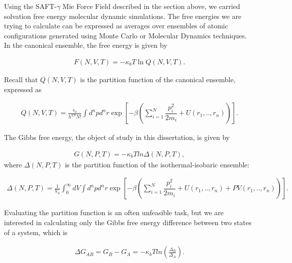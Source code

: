 	Using the SAFT-$\gamma$ Mie Force Field described in the section above, we carried solvation free energy molecular dynamic simulations. The free energies we are trying to calculate can be expressed as averages over ensembles of atomic configurations generated using Monte Carlo or Molecular Dynamics techniques. In the canonical ensemble, the free energy is given by  
	
	\begin{equation}
	\label{eq:fcano}
	\begin{aligned}
	F(N,V,T) = -\kappa_{b}T \ln Q(N,V,T).
	\end{aligned}
	\end{equation}
	
	Recall that $Q(N,V,T)$ is the partition function of the canonical ensemble, expressed as
	
	\begin{equation}
	\label{eq:partican}
	\begin{aligned}
	Q(N,V,T) =\frac{\epsilon_{0}}{h^{3N}N!} \int d^{n}p d^{n}r \exp \left[ -\beta \left( \sum_{i=1}^{N}\dfrac{p_{i}^{2}}{2m_{i}} + U(r_{1},..,r_{n}) \right)
	\right] .
	\end{aligned}
	\end{equation}
	
	The Gibbs free energy, the object of study in this dissertation, is given by
	
	\begin{equation}
	\label{eq:fisobari}
	\begin{aligned}
	G(N,P,T) = -\kappa_{b}T ln \Delta (N,P,T),
	\end{aligned}
	\end{equation}
	where $\Delta (N,P,T)$ is the partition function of the isothermal-isobaric ensemble:
	
	\begin{equation}
	\begin{aligned}
	\Delta (N,P,T) = \frac{1}{V_{0}} \int_{0}^{\infty} dV \int d^{n}p d^{n}r \exp \left[ -\beta \left( \sum_{i=1}^{N}\dfrac{p_{i}^{2}}{2m_{i}} + U(r_{1},..,r_{n}) + PV(r_{1},..,r_{n}) \right) \right].
	\end{aligned}
	\end{equation}
	
	Evaluating the partition function is an often unfeasible task, but we are interested in calculating only the Gibbs free energy difference between two states of a system, which is  
	
	\begin{equation}
	\begin{aligned}
	\Delta G_{AB} = G_{B} - G_{A}= -\kappa_{b}T ln \left( \frac{\Delta_{B}}{\Delta_{A}}\right) .
	\end{aligned}
	\end{equation}
	
